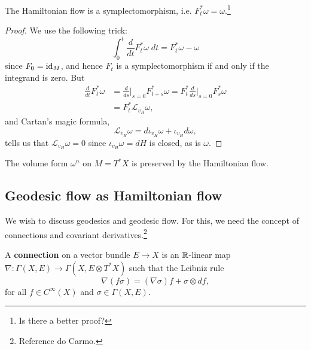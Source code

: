 \documentclass{amsart}
\begin{document}
\begin{proposition}
    The Hamiltonian flow is a symplectomorphism, i.e. $F_t^*\omega=\omega$.\footnote{Is there
    a better proof?}
\end{proposition}
\begin{proof}
    We use the following trick:
    \begin{equation*}
        \int_0^t \frac{d}{dt}F_t^*\omega\; dt = F_t^*\omega-\omega
    \end{equation*}
    since $F_0=\operatorname{id}_M$, and hence $F_t$ is a symplectomorphism if and only if the integrand
    is zero. But
    \begin{align*}
        \frac{d}{dt}F_t^*\omega &= \frac{d}{ds}\bigg|_{s=0}F_{t+s}^*\omega=F_t^*\frac{d}{ds}\bigg|_{s=0}F_s^*\omega \\
        &= F_t^*\mathcal{L}_{v_H}\omega,
    \end{align*}
    and Cartan's magic formula,
    \begin{equation*}
        \mathcal{L}_{v_H}\omega = d\iota_{v_H}\omega + \iota_{v_H}d\omega,
    \end{equation*}
    tells us that $\mathcal{L}_{v_H}\omega=0$ since $\iota_{v_H}\omega=dH$ is closed, as is $\omega$.
\end{proof}

\begin{corollary}
    The volume form $\omega^n$ on $M=T^*X$ is preserved by the Hamiltonian flow.
\end{corollary}


\subsection{Geodesic flow as Hamiltonian flow}

We wish to discuss geodesics and geodesic flow. For this, we need the concept
of connections and covariant derivatives.\footnote{Reference do Carmo.}
\begin{definition}
    A \textbf{connection} on a vector bundle $E\to X$ is an $\mathbb{R}$-linear map
    $\nabla:\Gamma(X,E)\to\Gamma(X,E\otimes T^*X)$ such that the Leibniz rule
    \begin{equation*}
        \nabla(f\sigma) = (\nabla \sigma)f + \sigma\otimes df,
    \end{equation*}
    for all $f\in C^\infty(X)$ and $\sigma\in\Gamma(X,E)$.
\end{definition}
\end{document}
